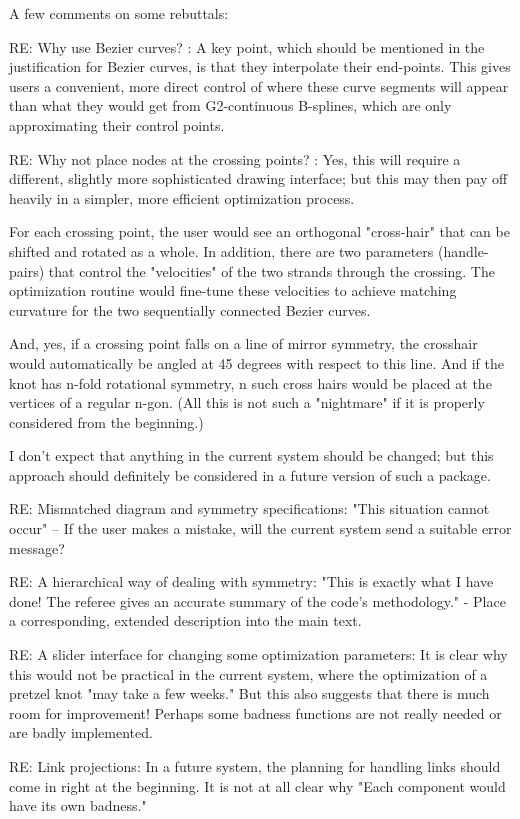 \documentclass[12pt]{article}
\begin{document}
A few comments on some rebuttals:

RE: Why use Bezier curves? : A key point, which should be mentioned in
the justification for Bezier curves, is that they interpolate their
end-points. This gives users a convenient, more direct control of
where these curve segments will appear than what they would get from
G2-continuous B-splines, which are only approximating their control
points.

RE: Why not place nodes at the crossing points? : Yes, this will
require a different, slightly more sophisticated drawing interface;
but this may then pay off heavily in a simpler, more efficient
optimization process.

For each crossing point, the user would see an orthogonal "cross-hair"
that can be shifted and rotated as a whole.  In addition, there are
two parameters (handle-pairs) that control the "velocities" of the two
strands through the crossing.  The optimization routine would
fine-tune these velocities to achieve matching curvature for the two
sequentially connected Bezier curves.

And, yes, if a crossing point falls on a line of mirror symmetry, the
crosshair would automatically be angled at 45 degrees with respect to
this line.  And if the knot has n-fold rotational symmetry, n such
cross hairs would be placed at the vertices of a regular n-gon.  (All
this is not such a "nightmare" if it is properly considered from the
beginning.)

I don't expect that anything in the current system should be changed;
but this approach should definitely be considered in a future version
of such a package.


RE: Mismatched diagram and symmetry specifications: "This situation
cannot occur" -- If the user makes a mistake, will the current system
send a suitable error message?

RE: A hierarchical way of dealing with symmetry: "This is exactly what
I have done!  The referee gives an accurate summary of the code's
methodology."  - Place a corresponding, extended description into the
main text.

RE: A slider interface for changing some optimization parameters: It
is clear why this would not be practical in the current system, where
the optimization of a pretzel knot "may take a few weeks."  But this
also suggests that there is much room for improvement!  Perhaps some
badness functions are not really needed or are badly implemented.

RE: Link projections: In a future system, the planning for handling
links should come in right at the beginning.  It is not at all clear
why "Each component would have its own badness."
\end{document}
